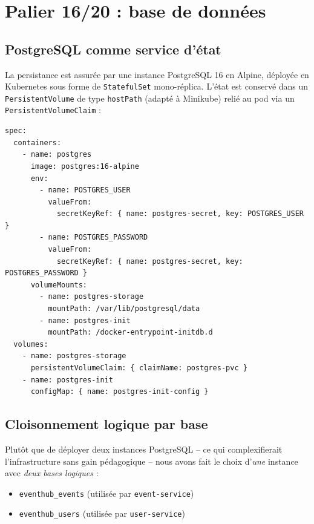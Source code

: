 \documentclass[11pt,a4paper]{article}
\newcommand{\code}[1]{\texttt{#1}}
\begin{document}
\section{Palier 16/20 : base de données}

\subsection{PostgreSQL comme service d'état}

La persistance est assurée par une instance PostgreSQL 16 en Alpine, déployée en Kubernetes sous forme de \code{StatefulSet} mono-réplica. L'état est conservé dans un \code{PersistentVolume} de type \code{hostPath} (adapté à Minikube) relié au pod via un \code{PersistentVolumeClaim} :

\begin{lstlisting}[caption={Extrait de \code{k8s/postgres-statefulset.yaml}}]
spec:
  containers:
    - name: postgres
      image: postgres:16-alpine
      env:
        - name: POSTGRES_USER
          valueFrom:
            secretKeyRef: { name: postgres-secret, key: POSTGRES_USER }
        - name: POSTGRES_PASSWORD
          valueFrom:
            secretKeyRef: { name: postgres-secret, key: POSTGRES_PASSWORD }
      volumeMounts:
        - name: postgres-storage
          mountPath: /var/lib/postgresql/data
        - name: postgres-init
          mountPath: /docker-entrypoint-initdb.d
  volumes:
    - name: postgres-storage
      persistentVolumeClaim: { claimName: postgres-pvc }
    - name: postgres-init
      configMap: { name: postgres-init-config }
\end{lstlisting}

\subsection{Cloisonnement logique par base}

Plutôt que de déployer deux instances PostgreSQL -- ce qui complexifierait l'infrastructure sans gain pédagogique -- nous avons fait le choix d'\emph{une} instance avec \emph{deux bases logiques} :

\begin{itemize}
    \item \code{eventhub\_events} (utilisée par \code{event-service})
    \item \code{eventhub\_users} (utilisée par \code{user-service})
\end{itemize}
\end{document}
